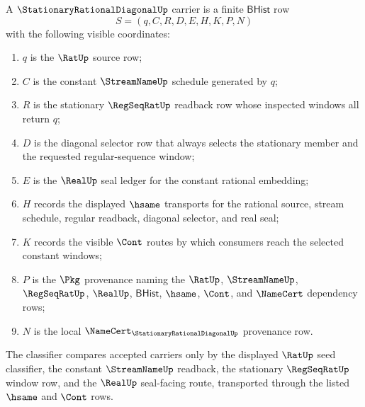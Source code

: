\begin{definition}
\label{def:stationary-rational-diagonal-carrier}
A $\StationaryRationalDiagonalUp$ carrier is a finite $\mathsf{BHist}$ row
$$
S=(q,C,R,D,E,H,K,P,N)
$$
with the following visible coordinates:
\begin{enumerate}
\item $q$ is the $\RatUp$ source row;
\item $C$ is the constant $\StreamNameUp$ schedule generated by $q$;
\item $R$ is the stationary $\RegSeqRatUp$ readback row whose inspected windows
all return $q$;
\item $D$ is the diagonal selector row that always selects the stationary
member and the requested regular-sequence window;
\item $E$ is the $\RealUp$ seal ledger for the constant rational embedding;
\item $H$ records the displayed $\hsame$ transports for the rational source,
stream schedule, regular readback, diagonal selector, and real seal;
\item $K$ records the visible $\Cont$ routes by which consumers reach the
selected constant windows;
\item $P$ is the $\Pkg$ provenance naming the $\RatUp$, $\StreamNameUp$,
$\RegSeqRatUp$, $\RealUp$, $\mathsf{BHist}$, $\hsame$, $\Cont$, and
$\NameCert$ dependency rows;
\item $N$ is the local $\NameCert_{\StationaryRationalDiagonalUp}$ provenance
row.
\end{enumerate}
The classifier compares accepted carriers only by the displayed $\RatUp$ seed
classifier, the constant $\StreamNameUp$ readback, the stationary
$\RegSeqRatUp$ window row, and the $\RealUp$ seal-facing route, transported
through the listed $\hsame$ and $\Cont$ rows.
\end{definition}

